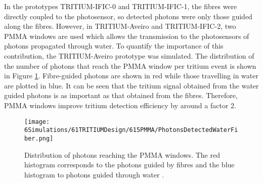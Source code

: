 In the prototypes TRITIUM-IFIC-0 and TRITIUM-IFIC-1, the fibres were directly coupled to the photosensor, so detected photons were only those guided along the fibres. However, in TRITIUM-Aveiro and TRITIUM-IFIC-2, two PMMA windows are used which allows the transmission to the photosensors of photons propagated through water. To quantify the importance of this contribution, the TRITIUM-Aveiro prototype was simulated. The distribution of the number of photons that reach the PMMA window per tritium event is shown in Figure \ref{fig:PMMAEffect}. Fibre-guided photons are shown in red while those travelling in water are plotted in blue. It can be seen that the tritium signal obtained from the water guided photons is as important as that obtained from the fibres. Therefore, PMMA windows improve tritium detection efficiency by around a factor 2.

\begin{figure}[hbtp]
\centering
\texttt{[image: 6Simulations/61TRITIUMDesign/615PMMA/PhotonsDetectedWaterFiber.png]}
\caption{Distribution of photons reaching the PMMA windows. The red histogram corresponds to the photons guided by fibres and the blue histogram to photons guided through water \cite{SimulationPaperCarlos}.\label{fig:PMMAEffect}}
\end{figure}

